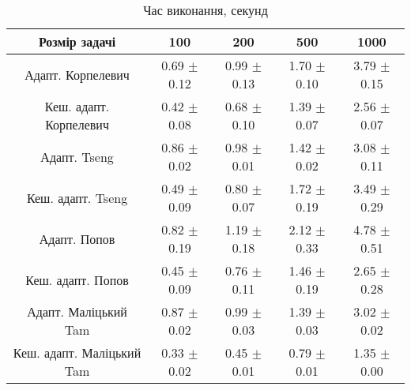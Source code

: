 \begin{table}[H]
	\centering
	\begin{tabular}{|c||c|c|c|c|}\hline
		Розмір задачі & 100 & 200 & 500 & 1000 \\ \hline \hline
		Адапт. Корпелевич & 0.69 $\pm$ 0.12 & 0.99 $\pm$ 0.13 & 1.70 $\pm$ 0.10 & 3.79 $\pm$ 0.15 \\ \hline
		Кеш. адапт. Корпелевич & 0.42 $\pm$ 0.08 & 0.68 $\pm$ 0.10 & 1.39 $\pm$ 0.07 & 2.56 $\pm$ 0.07 \\ \hline
		Адапт. Tseng & 0.86 $\pm$ 0.02 & 0.98 $\pm$ 0.01 & 1.42 $\pm$ 0.02 & 3.08 $\pm$ 0.11 \\ \hline
		Кеш. адапт. Tseng & 0.49 $\pm$ 0.09 & 0.80 $\pm$ 0.07 & 1.72 $\pm$ 0.19 & 3.49 $\pm$ 0.29 \\ \hline
		Адапт. Попов & 0.82 $\pm$ 0.19 & 1.19 $\pm$ 0.18 & 2.12 $\pm$ 0.33 & 4.78 $\pm$ 0.51 \\ \hline
		Кеш. адапт. Попов & 0.45 $\pm$ 0.09 & 0.76 $\pm$ 0.11 & 1.46 $\pm$ 0.19 & 2.65 $\pm$ 0.28 \\ \hline
		Адапт. Маліцький Tam & 0.87 $\pm$ 0.02 & 0.99 $\pm$ 0.03 & 1.39 $\pm$ 0.03 & 3.02 $\pm$ 0.02 \\ \hline
		Кеш. адапт. Маліцький Tam & 0.33 $\pm$ 0.02 & 0.45 $\pm$ 0.01 & 0.79 $\pm$ 0.01 & 1.35 $\pm$ 0.00 \\ \hline
	\end{tabular}
	\caption{Час виконання, секунд}
\end{table}
